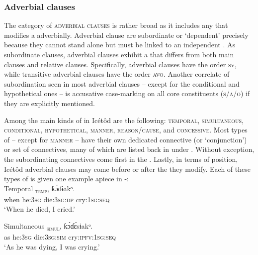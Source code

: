 \subsubsection{Adverbial clauses}\label{sec:10.3.3}

The category of \textsc{adverbial clauses} is rather broad as it includes any  that modifies a  adverbially. Adverbial clause are subordinate or ‘dependent’ precisely because they cannot stand alone but must be linked to an independent . As subordinate clauses, adverbial clauses exhibit a  that differs from both main clauses and relative clauses. Specifically,  adverbial clauses have the order \textsc{sv}, while transitive adverbial clauses have the order \textsc{avo}. Another correlate of subordination seen in most adverbial clauses – except for the conditional and hypothetical ones – is accusative case-marking on all core constituents (\textsc{s/a/o}) if they are explicitly mentioned. 

Among the main kinds of  in Icétôd are the following: \textsc{temporal}, \textsc{simultaneous}, \textsc{conditional}, \textsc{hypothetical}, \textsc{manner}, \textsc{reason}/\textsc{cause}, and \textsc{concessive}. Most types of  – except for \textsc{manner} – have their own dedicated connective (or ‘conjunction’) or set of connectives, many of which are listed back in  under . Without exception, the subordinating connectives come first in the . Lastly, in terms of position, Icétôd adverbial clauses may come before or after the  they modify. Each of these types of  is given one example apiece in -:\\



Temporal
\ea\label{ex:syn:37}
\textsc{\textsubscript{temp}},   ƙ\'{ɔ}ɗɨakᵒ. \\
when   he:\textsc{3sg}   die:\textsc{3sg:dp}     cry:\textsc{1sg:seq}    \\
\glt ‘When he died, I cried.’ 
\z



Simultaneous
\ea\label{ex:syn:38}
\textsc{\textsubscript{simul}},   ƙ\'{ɔ}ɗ\'{ɛ}sɨakᵒ. \\
as   he:\textsc{3sg}   die:\textsc{3sg:sim}    cry:\textsc{ipfv}:\textsc{1sg:seq}    \\
\glt ‘As he was dying, I was crying.’ 
\z



